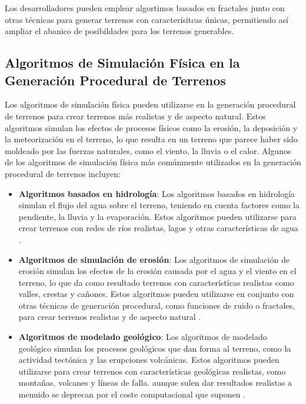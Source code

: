 Los desarrolladores pueden emplear algortimos basados en fractales junto con otras técnicas para generar terrenos con caracterísitcas únicas, permitiendo así ampliar el abanico de posibildades para los terrenos generables.

\subsection{Algoritmos de Simulación Física en la Generación Procedural de Terrenos}

Los algoritmos de simulación física pueden utilizarse en la generación procedural de terrenos para crear terrenos más realistas y de aspecto natural. Estos algoritmos simulan los efectos de procesos físicos como la erosión, la deposición y la meteorización en el terreno, lo que resulta en un terreno que parece haber sido moldeado por las fuerzas naturales, como el viento, la lluvia o el calor. Algunos de los algoritmos de simulación física más comúnmente utilizados en la generación procedural de terrenos incluyen:

\begin{itemize}
    \item \textbf{Algoritmos basados en hidrología}: Los algoritmos basados en hidrología simulan el flujo del agua sobre el terreno, teniendo en cuenta factores como la pendiente, la lluvia y la evaporación. Estos algoritmos pueden utilizarse para crear terrenos con redes de ríos realistas, lagos y otras características de agua \cite{AlgoritmosHidrologia} \cite{HidrologiaDocumento}.
    
    \item \textbf{Algoritmos de simulación de erosión}: Los algoritmos de simulación de erosión simulan los efectos de la erosión causada por el agua y el viento en el terreno, lo que da como resultado terrenos con características realistas como valles, crestas y cañones. Estos algoritmos pueden utilizarse en conjunto con otras técnicas de generación procedural, como funciones de ruido o fractales, para crear terrenos realistas y de aspecto natural \cite{AlgoritmosErosion} \cite{ErosionReddit}.
    
    \item \textbf{Algoritmos de modelado geológico}: Los algoritmos de modelado geológico simulan los procesos geológicos que dan forma al terreno, como la actividad tectónica y las erupciones volcánicas. Estos algoritmos pueden utilizarse para crear terrenos con características geológicas realistas, como montañas, volcanes y líneas de falla. aunque sulen dar resultados realistas a menuido se deprecan por el coste computacional que suponen \cite{ModeladoGeologico} \cite{GeologiaDocumento}.
\end{itemize}

